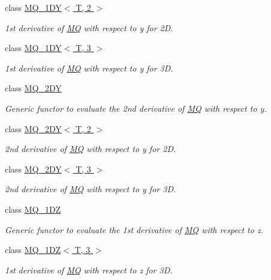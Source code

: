 \begin{CompactItemize}
class \hyperlink{classRBF_1_1MQ__1DY_3_01T_00_012_01_4}{MQ\_\-1DY$<$ T, 2 $>$}
\begin{CompactList}\small\item\em 1st derivative of \hyperlink{classRBF_1_1MQ}{MQ} with respect to y for 2D. \item\end{CompactList}\item 
class \hyperlink{classRBF_1_1MQ__1DY_3_01T_00_013_01_4}{MQ\_\-1DY$<$ T, 3 $>$}
\begin{CompactList}\small\item\em 1st derivative of \hyperlink{classRBF_1_1MQ}{MQ} with respect to y for 3D. \item\end{CompactList}\item 
class \hyperlink{classRBF_1_1MQ__2DY}{MQ\_\-2DY}
\begin{CompactList}\small\item\em Generic functor to evaluate the 2nd derivative of \hyperlink{classRBF_1_1MQ}{MQ} with respect to y. \item\end{CompactList}\item 
class \hyperlink{classRBF_1_1MQ__2DY_3_01T_00_012_01_4}{MQ\_\-2DY$<$ T, 2 $>$}
\begin{CompactList}\small\item\em 2nd derivative of \hyperlink{classRBF_1_1MQ}{MQ} with respect to y for 2D. \item\end{CompactList}\item 
class \hyperlink{classRBF_1_1MQ__2DY_3_01T_00_013_01_4}{MQ\_\-2DY$<$ T, 3 $>$}
\begin{CompactList}\small\item\em 2nd derivative of \hyperlink{classRBF_1_1MQ}{MQ} with respect to y for 3D. \item\end{CompactList}\item 
class \hyperlink{classRBF_1_1MQ__1DZ}{MQ\_\-1DZ}
\begin{CompactList}\small\item\em Generic functor to evaluate the 1st derivative of \hyperlink{classRBF_1_1MQ}{MQ} with respect to z. \item\end{CompactList}\item 
class \hyperlink{classRBF_1_1MQ__1DZ_3_01T_00_013_01_4}{MQ\_\-1DZ$<$ T, 3 $>$}
\begin{CompactList}\small\item\em 1st derivative of \hyperlink{classRBF_1_1MQ}{MQ} with respect to z for 3D. \item\end{CompactList}\item 

\end{CompactItemize}
